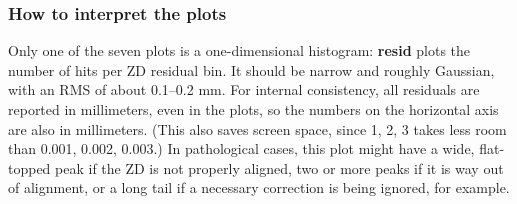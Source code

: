 \documentclass[12pt]{article}
\begin{document}
\subsubsection{How to interpret the plots}

Only one of the seven plots is a one-dimensional histogram: {\bf
resid} plots the number of hits per ZD residual bin.  It should be
narrow and roughly Gaussian, with an RMS of about 0.1--0.2 mm.  For
internal consistency, all residuals are reported in millimeters, even
in the plots, so the numbers on the horizontal axis are also in
millimeters.  (This also saves screen space, since 1, 2, 3 takes less
room than 0.001, 0.002, 0.003.)  In pathological cases, this plot
might have a wide, flat-topped peak if the ZD is not properly aligned,
two or more peaks if it is way out of alignment, or a long tail if a
necessary correction is being ignored, for example.
\end{document}
